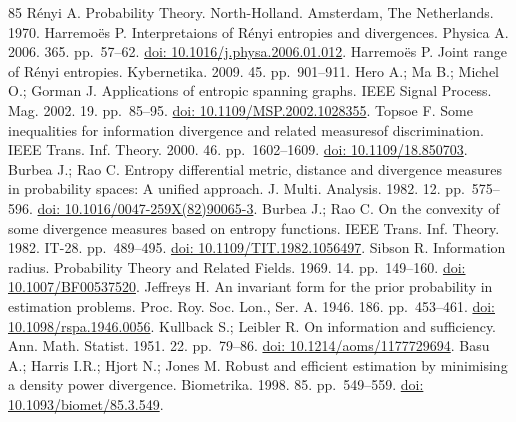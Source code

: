 \begin{thebibliography}{85}
\hypertarget{B57-entropy-12-01532}{} Rényi A. Probability Theory. North-Holland. Amsterdam, The Netherlands. 1970.
\hypertarget{B58-entropy-12-01532}{} Harremoës P. Interpretaions of Rényi entropies and divergences. Physica A. 2006. 365. pp.~57--62. \href{https://doi.org/10.1016/j.physa.2006.01.012}{doi: 10.1016/j.physa.2006.01.012}.
\hypertarget{B59-entropy-12-01532}{} Harremoës P. Joint range of Rényi entropies. Kybernetika. 2009. 45. pp.~901--911.
\hypertarget{B60-entropy-12-01532}{} Hero A.; Ma B.; Michel O.; Gorman J. Applications of entropic spanning graphs. IEEE Signal Process. Mag. 2002. 19. pp.~85--95. \href{https://doi.org/10.1109/MSP.2002.1028355}{doi: 10.1109/MSP.2002.1028355}.
\hypertarget{B61-entropy-12-01532}{} Topsoe F. Some inequalities for information divergence and related measuresof discrimination. IEEE Trans. Inf. Theory. 2000. 46. pp.~1602--1609. \href{https://doi.org/10.1109/18.850703}{doi: 10.1109/18.850703}.
\hypertarget{B62-entropy-12-01532}{} Burbea J.; Rao C. Entropy differential metric, distance and divergence measures in probability spaces: A unified approach. J. Multi. Analysis. 1982. 12. pp.~575--596. \href{https://doi.org/10.1016/0047-259X(82)90065-3}{doi: 10.1016/0047-259X(82)90065-3}.
\hypertarget{B63-entropy-12-01532}{} Burbea J.; Rao C. On the convexity of some divergence measures based on entropy functions. IEEE Trans. Inf. Theory. 1982. IT-28. pp.~489--495. \href{https://doi.org/10.1109/TIT.1982.1056497}{doi: 10.1109/TIT.1982.1056497}.
\hypertarget{B64-entropy-12-01532}{} Sibson R. Information radius. Probability Theory and Related Fields. 1969. 14. pp.~149--160. \href{https://doi.org/10.1007/BF00537520}{doi: 10.1007/BF00537520}.
\hypertarget{B65-entropy-12-01532}{} Jeffreys H. An invariant form for the prior probability in estimation problems. Proc. Roy. Soc. Lon., Ser. A. 1946. 186. pp.~453--461. \href{https://doi.org/10.1098/rspa.1946.0056}{doi: 10.1098/rspa.1946.0056}.
\hypertarget{B66-entropy-12-01532}{} Kullback S.; Leibler R. On information and sufficiency. Ann. Math. Statist. 1951. 22. pp.~79--86. \href{https://doi.org/10.1214/aoms/1177729694}{doi: 10.1214/aoms/1177729694}.
\hypertarget{B67-entropy-12-01532}{} Basu A.; Harris I.R.; Hjort N.; Jones M. Robust and efficient estimation by minimising a density power divergence. Biometrika. 1998. 85. pp.~549--559. \href{https://doi.org/10.1093/biomet/85.3.549}{doi: 10.1093/biomet/85.3.549}.

\end{thebibliography}

